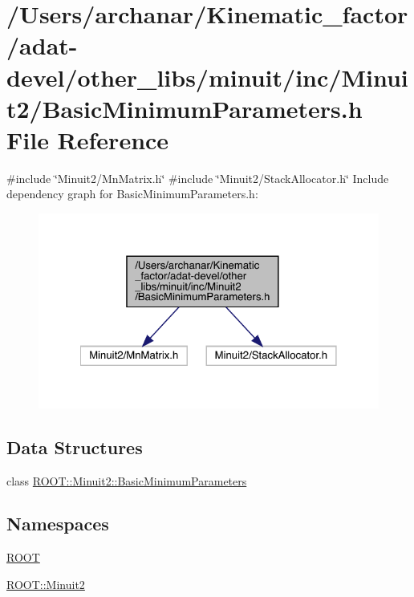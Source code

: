 \hypertarget{adat-devel_2other__libs_2minuit_2inc_2Minuit2_2BasicMinimumParameters_8h}{}\section{/\+Users/archanar/\+Kinematic\+\_\+factor/adat-\/devel/other\+\_\+libs/minuit/inc/\+Minuit2/\+Basic\+Minimum\+Parameters.h File Reference}
\label{adat-devel_2other__libs_2minuit_2inc_2Minuit2_2BasicMinimumParameters_8h}
{\ttfamily \#include \char`\"{}Minuit2/\+Mn\+Matrix.\+h\char`\"{}}\newline
{\ttfamily \#include \char`\"{}Minuit2/\+Stack\+Allocator.\+h\char`\"{}}\newline
Include dependency graph for Basic\+Minimum\+Parameters.\+h\+:
\nopagebreak
\begin{figure}[H]
\begin{center}
\leavevmode
\includegraphics[width=322pt]{de/d85/adat-devel_2other__libs_2minuit_2inc_2Minuit2_2BasicMinimumParameters_8h__incl}
\end{center}
\end{figure}
\subsection*{Data Structures}
\begin{DoxyCompactItemize}
\item 
class \mbox{\hyperlink{classROOT_1_1Minuit2_1_1BasicMinimumParameters}{R\+O\+O\+T\+::\+Minuit2\+::\+Basic\+Minimum\+Parameters}}
\end{DoxyCompactItemize}
\subsection*{Namespaces}
\begin{DoxyCompactItemize}
\item 
 \mbox{\hyperlink{namespaceROOT}{R\+O\+OT}}
\item 
 \mbox{\hyperlink{namespaceROOT_1_1Minuit2}{R\+O\+O\+T\+::\+Minuit2}}
\end{DoxyCompactItemize}
